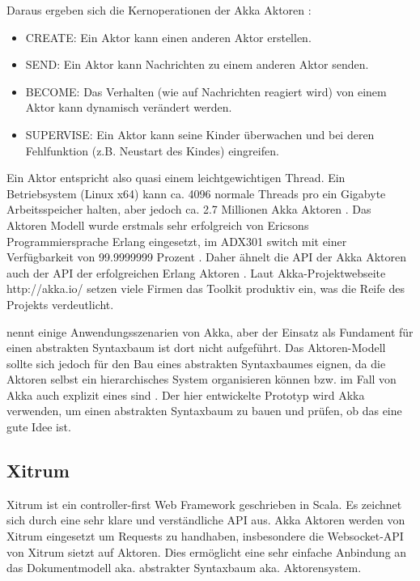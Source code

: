 Daraus ergeben sich die Kernoperationen der Akka Aktoren \citep[S.~23]{Roestenburg}:

 
\begin{itemize}

\item CREATE: Ein Aktor kann einen anderen Aktor erstellen.
\item SEND: Ein Aktor kann Nachrichten zu einem anderen Aktor senden.
\item BECOME: Das Verhalten (wie auf Nachrichten reagiert wird) von einem Aktor kann dynamisch verändert werden.
\item SUPERVISE: Ein Aktor kann seine Kinder überwachen und bei deren Fehlfunktion (z.B. Neustart des Kindes) eingreifen.
\end{itemize}
 
Ein Aktor entspricht also quasi einem leichtgewichtigen Thread. Ein Betriebsystem (Linux x64) kann ca. 4096 normale Threads pro ein Gigabyte Arbeitsspeicher halten, aber jedoch ca. 2.7 Millionen Akka Aktoren \citep[S.~20]{Roestenburg}. Das Aktoren Modell wurde erstmals sehr erfolgreich von Ericsons Programmiersprache Erlang eingesetzt, im ADX301 switch mit einer Verfügbarkeit von 99.9999999 Prozent \citep[S.~12]{Roestenburg}. Daher ähnelt die API der Akka Aktoren auch der API der erfolgreichen Erlang Aktoren \citep[S.~69]{Typesave}. Laut Akka-Projektwebseite http://akka.io/ setzen viele Firmen das Toolkit produktiv ein, was die Reife des Projekts verdeutlicht.

 
\citep[S.~7]{Typesave} nennt einige Anwendungsszenarien von Akka, aber der Einsatz als Fundament für einen abstrakten Syntaxbaum ist dort nicht aufgeführt. Das Aktoren-Modell sollte sich jedoch für den Bau eines abstrakten Syntaxbaumes eignen, da die Aktoren selbst ein hierarchisches System organisieren können bzw. im Fall von Akka auch explizit eines sind \citep[S.~22]{Roestenburg}. Der hier entwickelte Prototyp wird Akka verwenden, um einen abstrakten Syntaxbaum zu bauen und prüfen, ob das eine gute Idee ist.

 
\subsection{Xitrum}\label{}
 
Xitrum ist ein controller-first Web Framework geschrieben in Scala. Es zeichnet sich durch eine sehr klare und verständliche API aus. Akka Aktoren werden von Xitrum eingesetzt um Requests zu handhaben, insbesondere die Websocket-API von Xitrum sietzt auf Aktoren. Dies ermöglicht eine sehr einfache Anbindung an das Dokumentmodell aka. abstrakter Syntaxbaum aka. Aktorensystem.

